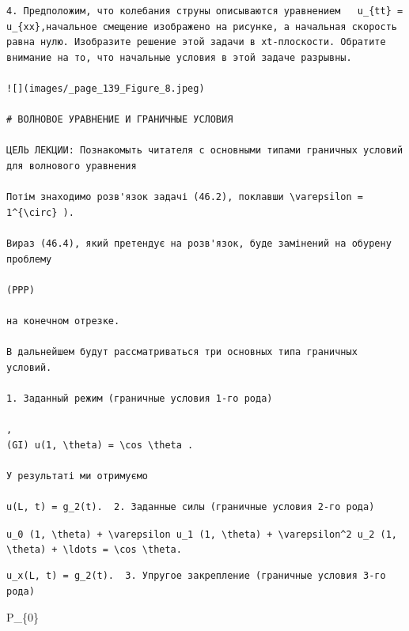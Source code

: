\documentclass[
  ukrainian,
]{article}
\begin{document}
\begin{verbatim}
4. Предположим, что колебания струны описываются уравнением   u_{tt} = u_{xx},начальное смещение изображено на рисунке, а начальная скорость равна нулю. Изобразите решение этой задачи в xt-плоскости. Обратите внимание на то, что начальные условия в этой задаче разрывны.

![](images/_page_139_Figure_8.jpeg)

# ВОЛНОВОЕ УРАВНЕНИЕ И ГРАНИЧНЫЕ УСЛОВИЯ

ЦЕЛЬ ЛЕКЦИИ: Познакомыть читателя с основными типами граничных условий для волнового уравнения

Потім знаходимо розв'язок задачі (46.2), поклавши \varepsilon = 1^{\circ} ).

Вираз (46.4), який претендує на розв'язок, буде замінений на обурену проблему

(PPP)

на конечном отрезке.

В дальнейшем будут рассматриваться три основных типа граничных условий.

1. Заданный режим (граничные условия 1-го рода)

, 
(GI) u(1, \theta) = \cos \theta .

У результаті ми отримуємо

u(L, t) = g_2(t).  2. Заданные силы (граничные условия 2-го рода)
\end{verbatim}

\texttt{u\_0\ (1,\ \textbackslash{}theta)\ +\ \textbackslash{}varepsilon\ u\_1\ (1,\ \textbackslash{}theta)\ +\ \textbackslash{}varepsilon\^{}2\ u\_2\ (1,\ \textbackslash{}theta)\ +\ \textbackslash{}ldots\ =\ \textbackslash{}cos\ \textbackslash{}theta.}

\begin{verbatim}
u_x(L, t) = g_2(t).  3. Упругое закрепление (граничные условия 3-го рода)
\end{verbatim}

P\_\{0\}
\end{document}
